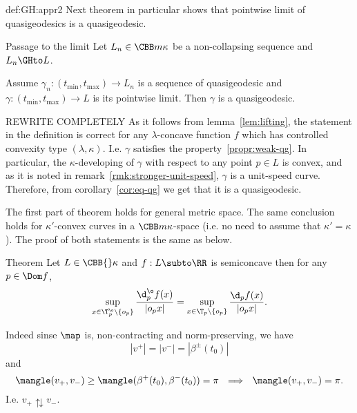 {\begin{subthm}{def:GH:appr2}
Next theorem in particular shows that pointwise limit of quasigeodesics is a quasigeodesic.

\begin{thm}{Passage to the limit}\label{thm:limit-qg}
Let $L_n\in\CBB m\kappa$ be a non-collapsing sequence and $L_n\GHto L$.

Assume $\gamma_n:(t_{\min},t_{\max})\to L_n$ is a sequence of quasigeodesic and $\gamma:(t_{\min},t_{\max})\to L$ is its pointwise limit.
Then $\gamma$ is a quasigeodesic.
\end{thm}


 REWRITE COMPLETELY
As it follows from lemma~\ref{lem:lifting}, the statement in the
definition is correct for any $\lambda$-concave function $f$ which has
controlled convexity type $(\lambda,\kappa)$.
I.e. $\gamma$ satisfies the property~\ref{propr:weak-qg}. 
In particular, the $\kappa$-developing of $\gamma$ with respect to any point $p\in L$ is convex, and as it is noted in remark~\ref{rmk:stronger-unit-speed}, $\gamma$ is a
unit-speed curve.
Therefore, from corollary~\ref{cor:eq-qg} we get that it is a quasigeodesic.
\qeds












The first part of theorem holds for general metric space.
The same conclusion holds for $\kappa'$-convex curves in a $\CBB m\kappa$-space (i.e. no need to assume that $\kappa'=\kappa$).
The proof of both statements is the same as below.






\begin{thm}{Theorem}
Let $L\in\CBB{}\kappa$ and $f:L\subto\RR$ is semiconcave then for any $p\in\Dom f$,
$$\sup_{x\in \T^\o_p\backslash \{o_p\}}\frac{\d_p^\o f(x)}{|o_px|}=\sup_{x\in\T_p\backslash \{o_p\}}\frac{\d_pf(x)}{|o_px|}.$$ 
\end{thm}

















Indeed sinse $\map$ is,  non-contracting and norm-preserving, we have 
$$|v^+|=|v^-|=|\beta^\pm(t_0)|$$
and
$$\mangle(v_+,v_-)\ge \mangle(\beta^+(t_0),\beta^-(t_0))=\pi\ \ \Longrightarrow\ \ \mangle(v_+,v_-)=\pi.$$ I.e. $v_+\updownarrows v_-$.


\end{subthm}}
